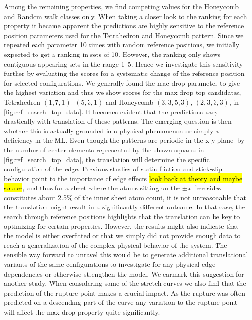 Among the remaining properties, we find competing values for the Honeycomb and Random walk classes only. When taking a closer look to the ranking for each property it became apparent the predictions are highly sensitive
to the reference position parameters used for the Tetrahedron and Honeycomb
pattern. Since we repeated each parameter 10 times with random reference positions, we initially expected to get a ranking in sets of 10. However, the ranking only shows contiguous appearing sets in the range 1--5. Hence we investigate this sensitivity further by evaluating the scores for a systematic change of the reference position for selected configurations. We generally found the mac drop parameter to give the highest variation and thus we show scores for the max drop top candidates, Tetrahedron $(1,7,1)$, $(5,3,1)$ and Honeycomb $(3,3,5,3)$, $(2,3,3,3)$, in
\cref{fig:ref_search_top_data}. It becomes evident that the predictions vary
drastically with translation of these patterns. The emerging question is then whether this is actually grounded in a physical phenomenon or simply a deficiency in the \acrshort{ML}. Even though the patterns are periodic in the x-y-plane, by the number of center elements represented by the shown squares in \cref{fig:ref_search_top_data}, the translation will determine the specific configuration of the edge. Previous studies of static friction and stick-slip behavior point to the importance of edge effects \hl{look back at theory and
maybe source}, and thus for a sheet where the atoms sitting on the $\pm x$ free sides constitutes about 2.5\% of the inner sheet atom count, it is not unreasonable
that the translation might result in a significantly different outcome. In that case, the search through reference positions highlights that the translation can be key to optimizing for certain properties. However, the results might also indicate that the model is either overfitted or that we simply did not provide enough data to reach a generalization of the complex physical behavior of the system. The sensible way forward to unravel this would be to generate additional
translational variants of the same configurations to investigate for any physical edge dependencies or otherwise strengthen the model. We earmark this suggestion for another study. When considering some of the stretch curves we also find that the prediction of the rupture point makes a crucial impact. As the rupture was often predicted on a descending part of the curve any variation to the rupture point will affect the max drop property quite significantly.





